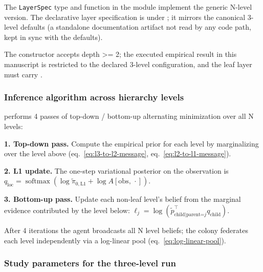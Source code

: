\documentclass[
  english,
]{article}
\theoremstyle{plain}
\theoremstyle{definition}
\theoremstyle{remark}
\theoremstyle{definition}
\begin{document}
The \texttt{LayerSpec} type and  function
in the  module implement the generic N-level
version. The declarative layer specification is
 under
; it mirrors the canonical 3-level
defaults (a standalone documentation artifact not read by any code path,
kept in sync with the  defaults).

The constructor accepts depth \texorpdfstring{\textgreater{}=}{>=} 2; the executed empirical result in this
manuscript is restricted to the declared 3-level configuration, and the
leaf layer must carry .

\subsubsection{Inference algorithm across hierarchy
levels}\label{inference-algorithm-across-hierarchy-levels}

 performs 4 passes of top-down /
bottom-up alternating minimization over all N levels:

\textbf{1. Top-down pass.} Compute the empirical prior for each level by
marginalizing over the level above (eq.~\ref{eq:l3-to-l2-message},
eq.~\ref{eq:l2-to-l1-message}).

\textbf{2. L1 update.} The one-step variational posterior on the
observation is
\(q_{\text{loc}} = \operatorname{softmax}(\log \widetilde{\pi}_{0,\mathrm{L1}} +
\log A[\text{obs},\,\cdot])\).

\textbf{3. Bottom-up pass.} Update each non-leaf level's belief from the
marginal evidence contributed by the level below:
\(\ell_j = \log(\tilde{p}_{\text{child|parent=}j}^\top q_{\text{child}})\).

After 4 iterations the agent broadcasts all N level beliefs; the colony
federates each level independently via a log-linear pool
(eq.~\ref{eq:log-linear-pool}).

\subsubsection{Study parameters for the three-level
run}\label{study-parameters-for-the-three-level-run}
\end{document}
